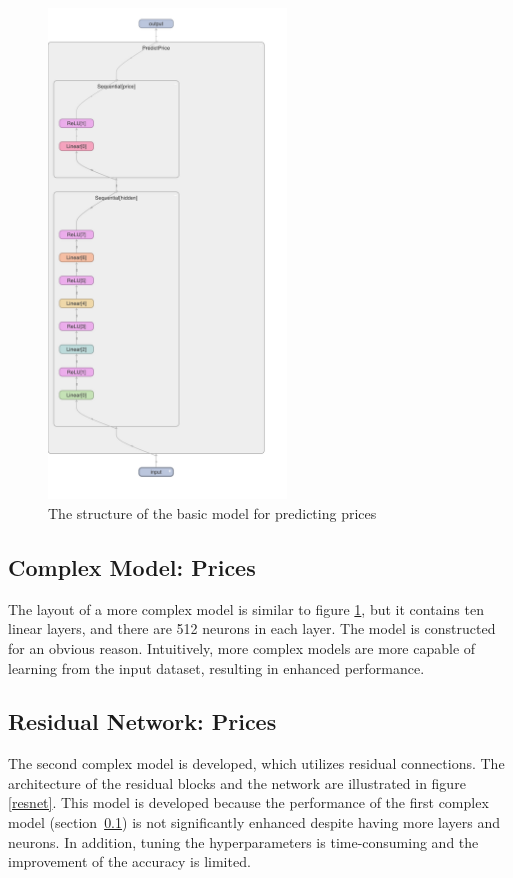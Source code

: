 \documentclass[12pt,twoside]{report}
\begin{document}
\begin{figure}[h]
	\centering
	\includegraphics[height=13cm]{basic_model_price}
	\caption{The structure of the basic model for predicting prices}
	\label{basic_model_price}
\end{figure}

\subsection{Complex Model: Prices}
\label{complex_model_construct}
The layout of a more complex model is similar to figure \ref{basic_model_price}, but it contains ten linear layers, and there are 512 neurons in each layer. The model is constructed for an obvious reason. Intuitively, more complex models are more capable of learning from the input dataset, resulting in enhanced performance. 

\subsection{Residual Network: Prices}
The second complex model is developed, which utilizes residual connections. The architecture of the residual blocks and the network are illustrated in figure \ref{resnet}. This model is developed because the performance of the first complex model (\mbox{section \ref{complex_model_construct}}) is not significantly enhanced despite having more layers and neurons. In addition, tuning the hyperparameters is time-consuming and the improvement of the accuracy is limited. 
\end{document}
